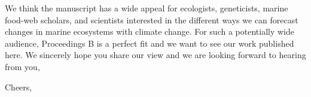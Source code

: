 \documentclass[11pt,letterpaper]{letter}
\begin{document}
\begin{letter}
We think the manuscript has a wide appeal for ecologists, geneticists, marine food-web scholars, and scientists interested in the different ways we can forecast changes in marine ecosystems with climate change. For such a potentially wide audience, Proceedings B is a perfect fit and we want to see our work published here. We sincerely hope you share our view and we are looking forward to hearing from you,





 
\closing{Cheers,}

\end{letter}
\end{document}
